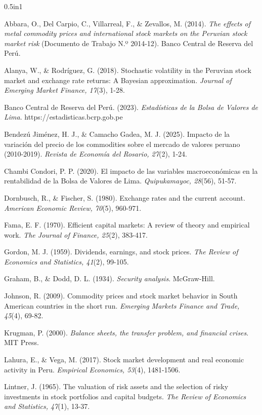 \documentclass[12pt, a4paper]{article}
\begin{document}
\begin{hangparas}{0.5in}{1}

Abbara, O., Del Carpio, C., Villarreal, F., \& Zevallos, M. (2014). \textit{The effects of metal commodity prices and international stock markets on the Peruvian stock market risk} (Documento de Trabajo N.º 2014-12). Banco Central de Reserva del Perú.

Alanya, W., \& Rodríguez, G. (2018). Stochastic volatility in the Peruvian stock market and exchange rate returns: A Bayesian approximation. \textit{Journal of Emerging Market Finance, 17}(3), 1-28.

Banco Central de Reserva del Perú. (2023). \textit{Estadísticas de la Bolsa de Valores de Lima}. https://estadisticas.bcrp.gob.pe

Bendezú Jiménez, H. J., \& Camacho Gadea, M. J. (2025). Impacto de la variación del precio de los commodities sobre el mercado de valores peruano (2010-2019). \textit{Revista de Economía del Rosario, 27}(2), 1-24.

Chambi Condori, P. P. (2020). El impacto de las variables macroeconómicas en la rentabilidad de la Bolsa de Valores de Lima. \textit{Quipukamayoc, 28}(56), 51-57.

Dornbusch, R., \& Fischer, S. (1980). Exchange rates and the current account. \textit{American Economic Review, 70}(5), 960-971.

Fama, E. F. (1970). Efficient capital markets: A review of theory and empirical work. \textit{The Journal of Finance, 25}(2), 383-417.

Gordon, M. J. (1959). Dividends, earnings, and stock prices. \textit{The Review of Economics and Statistics, 41}(2), 99-105.

Graham, B., \& Dodd, D. L. (1934). \textit{Security analysis}. McGraw-Hill.

Johnson, R. (2009). Commodity prices and stock market behavior in South American countries in the short run. \textit{Emerging Markets Finance and Trade, 45}(4), 69-82.

Krugman, P. (2000). \textit{Balance sheets, the transfer problem, and financial crises}. MIT Press.

Lahura, E., \& Vega, M. (2017). Stock market development and real economic activity in Peru. \textit{Empirical Economics, 53}(4), 1481-1506.

Lintner, J. (1965). The valuation of risk assets and the selection of risky investments in stock portfolios and capital budgets. \textit{The Review of Economics and Statistics, 47}(1), 13-37.


\end{hangparas}
\end{document}
